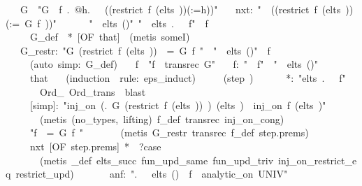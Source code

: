 \documentclass[runningheads]{llncs}
\begin{document}
\begin{isabelle}
\ \ \ G\ \ "G\ \isasymequiv \ \isasymlambda f\ \isasymgamma .\ @h.\ \isasymPhi \ \isasymgamma \ ((restrict\ f\ (elts\ \isasymgamma ))(\isasymgamma :=h))"\isanewline
\ \ \ nxt:\ "\isasymPhi \ \isasymgamma \ ((restrict\ f\ (elts\ \isasymgamma ))(\isasymgamma :=\ G\ f\ \isasymgamma ))"\ \isanewline
\ \ \ \ \ "\isasymgamma \ \isasymin \ elts\ ()"\ "\isasymforall \isasymbeta \ \isasymin \ elts\ \isasymgamma .\ \isasymPhi \ \isasymbeta \ f"\ \ f\ \isasymgamma \isanewline
\ \ \ \ \ G\_def\ \ *\ [OF\ that]\ \ (metis\ someI)\ \isanewline
\ \ \ G\_restr:\ "G\ (restrict\ f\ (elts\ \isasymgamma ))\ \isasymgamma \ =\ G\ f\ \isasymgamma "\ \ "\isasymgamma \ \isasymin \ elts\ ()"\ \ f\ \isasymgamma \isanewline
\ \ \ \ \ (auto\ simp:\ G\_def)\isanewline
\ \ \ f\ \ "f\ \isasymequiv \ transrec\ G"\isanewline
\ \ \ \isasymPhi f:\ "\isasymPhi \ \isasymbeta \ f"\ \ "\isasymbeta \ \isasymin \ elts\ ()"\ \ \isasymbeta \isanewline
\ \ \ \ \ that\isanewline
\ \ \ (induction\ \isasymbeta \ rule:\ eps\_induct)\isanewline
\ \ \ \ \ (step\ \isasymgamma )\isanewline
\ \ \ \ \ \ *:\ "\isasymforall \isasymbeta \isasymin elts\ \isasymgamma .\ \isasymPhi \ \isasymbeta \ f"\isanewline
\ \ \ \ \ \ \ Ord\_\ Ord\_trans\ \ blast\isanewline
\ \ \ \ \ [simp]:\ "inj\_on\ (\isasymlambda \isasymbeta .\ G\ (restrict\ f\ (elts\ \isasymbeta ))\ \isasymbeta )\ (elts\ \isasymgamma )\ \isasymlongleftrightarrow \ inj\_on\ f\ (elts\ \isasymgamma )"\isanewline
\ \ \ \ \ \ \ (metis\ (no\_types,\ lifting)\ f\_def\ transrec\ inj\_on\_cong)\isanewline
\ \ \ \ \ "f\ \isasymgamma \ =\ G\ f\ \isasymgamma "\isanewline
\ \ \ \ \ \ \ (metis\ G\_restr\ transrec\ f\_def\ step.prems)\isanewline
\ \ \ \ \ nxt\ [OF\ step.prems]\ *\ \ ?case\isanewline
\ \ \ \ \ \ \ (metis\ \isasymPhi \_def\ elts\_succ\ fun\_upd\_same\ fun\_upd\_triv\ inj\_on\_restrict\_eq\ restrict\_upd)\isanewline
\ \ \isanewline
\ \ \ \ anf:\ "\isasymAnd \isasymbeta .\ \isasymbeta \ \isasymin \ elts\ ()\ \isasymLongrightarrow \ f\ \isasymbeta \ analytic\_on\ UNIV"\isanewline

\end{isabelle}
\end{document}
